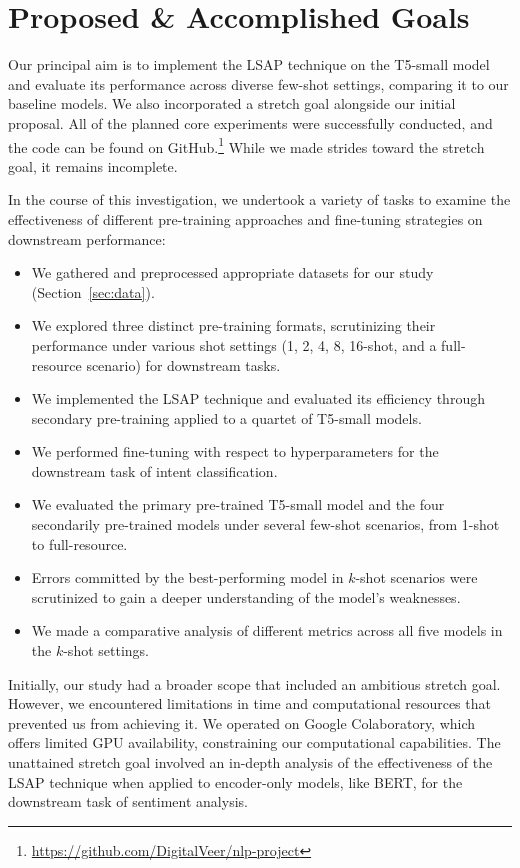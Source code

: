 \documentclass[11pt]{article}
\begin{document}
\section{Proposed \& Accomplished Goals}

Our principal aim is to implement the LSAP technique on the T5-small model
and evaluate its performance across diverse few-shot settings, comparing it
to our baseline models. We also incorporated a stretch goal alongside our
initial proposal. All of the planned core experiments were successfully
conducted, and the code can be found on
GitHub.\footnote{\url{https://github.com/DigitalVeer/nlp-project}} While we
made strides toward the stretch goal, it remains incomplete.

In the course of this investigation, we undertook a variety of tasks to
examine the effectiveness of different pre-training approaches and
fine-tuning strategies on downstream performance:

\begin{itemize}
  \item We gathered and preprocessed appropriate datasets for our study
        (Section~\ref{sec:data}).
  \item We explored three distinct pre-training formats, scrutinizing their
        performance under various shot settings (1, 2, 4, 8, 16-shot, and a
        full-resource scenario) for downstream tasks.
  \item We implemented the LSAP technique and evaluated its efficiency
        through secondary pre-training applied to a quartet of T5-small
        models.
  \item We performed fine-tuning with respect to hyperparameters for the
        downstream task of intent classification.
  \item We evaluated the primary pre-trained T5-small model and the four
        secondarily pre-trained models under several few-shot scenarios,
        from 1-shot to full-resource.
  \item Errors committed by the best-performing model in $k$-shot scenarios
        were scrutinized to gain a deeper understanding of the model's
        weaknesses.
  \item We made a comparative analysis of different metrics across all five
        models in the $k$-shot settings.
\end{itemize}

Initially, our study had a broader scope that included an ambitious stretch
goal. However, we encountered limitations in time and computational
resources that prevented us from achieving it. We operated on Google
Colaboratory, which offers limited GPU availability, constraining our
computational capabilities. The unattained stretch goal involved an in-depth
analysis of the effectiveness of the LSAP technique when applied to
encoder-only models, like BERT, for the downstream task of sentiment
analysis.
\end{document}

